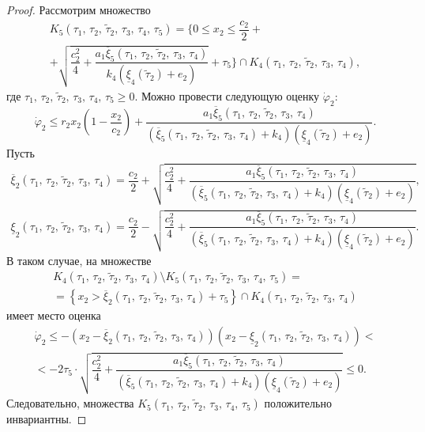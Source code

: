 \documentclass[14pt,a4paper]{extarticle}
\begin{document}
\begin{proof}
		Рассмотрим множество 
		\begin{multline*}
			K_5(\tau_1,\,\tau_2,\,\tilde{\tau}_2,\,\tau_3,\,\tau_4,\,\tau_5) = \biggr\{0 \leqslant x_2 \leqslant \dfrac{c_2}{2}+\\
			+\sqrt{\dfrac{c_2^2}{4}+\dfrac{a_1\overline{\xi}_5(\tau_1,\,\tau_2,\,\tilde{\tau}_2,\,\tau_3,\,\tau_4)}{k_4(\underline{\xi}_4(\tilde{\tau}_2)+e_2)}}+\tau_5\biggr\}\cap K_4(\tau_1,\,\tau_2,\,\tilde{\tau}_2,\,\tau_3,\,\tau_4),
		\end{multline*}
		где $\tau_1,\,\tau_2,\,\tilde{\tau}_2,\,\tau_3,\,\tau_4,\,\tau_5 \geqslant 0$.
		Можно провести следующую оценку $\dot{\varphi}_2$:
		\[\dot{\varphi}_2 \leqslant r_2x_2\left(1-\dfrac{x_2}{c_2}\right)+\dfrac{a_1\overline{\xi}_5(\tau_1,\,\tau_2,\,\tilde{\tau}_2,\,\tau_3,\,\tau_4)}{(\overline{\xi}_5(\tau_1,\,\tau_2,\,\tilde{\tau}_2,\,\tau_3,\,\tau_4)+k_4)(\underline{\xi}_4(\tilde{\tau}_2)+e_2)}.\]
		Пусть
		\begin{align*}
			\overline{\xi}_2(\tau_1,\,\tau_2,\,\tilde{\tau}_2,\,\tau_3,\,\tau_4) = \dfrac{c_2}{2}+\sqrt{\dfrac{c_2^2}{4}+\dfrac{a_1\overline{\xi}_5(\tau_1,\,\tau_2,\,\tilde{\tau}_2,\,\tau_3,\,\tau_4)}{(\overline{\xi}_5(\tau_1,\,\tau_2,\,\tilde{\tau}_2,\,\tau_3,\,\tau_4)+k_4)(\underline{\xi}_4(\tilde{\tau}_2)+e_2)}},\\
			\underline{\xi}_2(\tau_1,\,\tau_2,\,\tilde{\tau}_2,\,\tau_3,\,\tau_4) = \dfrac{c_2}{2}-\sqrt{\dfrac{c_2^2}{4}+\dfrac{a_1\overline{\xi}_5(\tau_1,\,\tau_2,\,\tilde{\tau}_2,\,\tau_3,\,\tau_4)}{(\overline{\xi}_5(\tau_1,\,\tau_2,\,\tilde{\tau}_2,\,\tau_3,\,\tau_4)+k_4)(\underline{\xi}_4(\tilde{\tau}_2)+e_2)}}.
		\end{align*}
		В таком случае, на множестве 
		\begin{multline*}
			K_4(\tau_1,\,\tau_2,\,\tilde{\tau}_2,\,\tau_3,\,\tau_4)\setminus K_5(\tau_1,\,\tau_2,\,\tilde{\tau}_2,\,\tau_3,\,\tau_4,\,\tau_5) =\\
			=\left\{x_2 > \overline{\xi}_2(\tau_1,\,\tau_2,\,\tilde{\tau}_2,\,\tau_3,\,\tau_4)+\tau_5\right\}\cap K_4(\tau_1,\,\tau_2,\,\tilde{\tau}_2,\,\tau_3,\,\tau_4)
		\end{multline*}
		имеет место оценка
		\begin{multline*}
			\dot{\varphi}_2 \leqslant -(x_2 - \overline{\xi}_2(\tau_1,\,\tau_2,\,\tilde{\tau}_2,\,\tau_3,\,\tau_4))(x_2 - \underline{\xi}_2(\tau_1,\,\tau_2,\,\tilde{\tau}_2,\,\tau_3,\,\tau_4)) <\\
			< -2\tau_5\cdot\sqrt{\dfrac{c_2^2}{4}+\dfrac{a_1\overline{\xi}_5(\tau_1,\,\tau_2,\,\tilde{\tau}_2,\,\tau_3,\,\tau_4)}{(\overline{\xi}_5(\tau_1,\,\tau_2,\,\tilde{\tau}_2,\,\tau_3,\,\tau_4)+k_4)(\underline{\xi}_4(\tilde{\tau}_2)+e_2)}} \leqslant 0.
		\end{multline*}
		Следовательно, множества $K_5(\tau_1,\,\tau_2,\,\tilde{\tau}_2,\,\tau_3,\,\tau_4,\,\tau_5)$ положительно инвариантны.
		

\end{proof}
\end{document}

